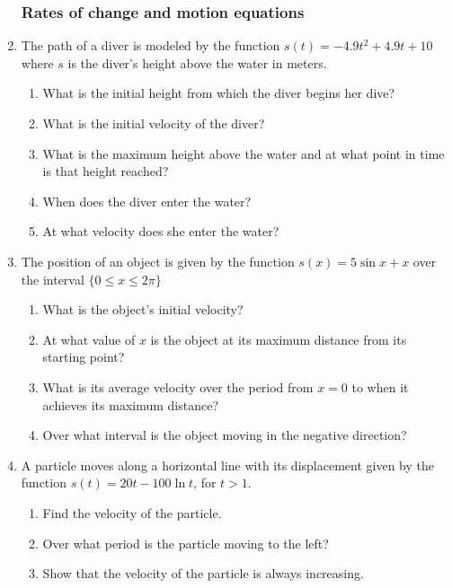 \documentclass[12pt, twoside]{article}
\begin{document}
\begin{enumerate}
\subsubsection*{Rates of change and motion equations}

\item The path of a diver is modeled by the function $s(t)=-4.9t^2+4.9t+10$ where $s$ is the diver's height above the water in meters.
  \begin{enumerate}
      \item What is the initial height from which the diver begins her dive?
      \item What is the initial velocity of the diver?
      \item What is the maximum height above the water and at what point in time is that height reached?
      \item When does the diver enter the water?
      \item At what velocity does she enter the water?
  \end{enumerate}

\item The position of an object is given by the function $s(x) = 5\sin x +x$ over the interval $\{0\leq x  \leq 2\pi \}$
  \begin{enumerate}
      \item What is the object's initial velocity?
      \item At what value of $x$ is the object at its maximum distance from its starting point?
      \item What is its average velocity over the period from $x=0$ to when it achieves its maximum distance?
      \item Over what interval is the object moving in the negative direction?
  \end{enumerate}


\item A particle moves along a horizontal line with its displacement given by the function $s(t) = 20t - 100 \ln{t}$, for $t>1$.
  \begin{enumerate}
      \item Find the velocity of the particle.
      \item Over what period is the particle moving to the left?
      \item Show that the velocity of the particle is always increasing.
  \end{enumerate}

\end{enumerate}
\end{document}
